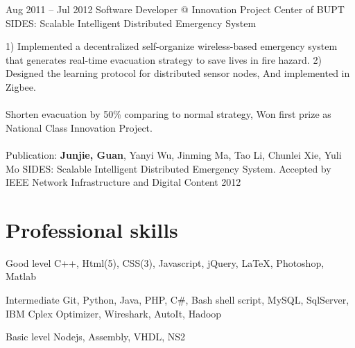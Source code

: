 \documentclass{tccv}
\begin{document}
\begin{eventlist}
    
    
    
    
    
    
    
    
    
    
    
    
    
   





\item{Aug 2011 -- Jul 2012}
     {Software Developer @ Innovation Project Center of BUPT}
     {SIDES: Scalable Intelligent Distributed Emergency System}
     
     1) Implemented a decentralized self-organize wireless-based emergency system that generates real-time evacuation strategy to save lives in fire hazard. 2) Designed the learning protocol for distributed sensor nodes, And implemented in Zigbee.
\\\\
Shorten evacuation by 50\% comparing to normal strategy, Won first prize as National Class Innovation Project.
\\\\
Publication: \textbf{Junjie, Guan}, Yanyi Wu, Jinming Ma, Tao Li, Chunlei Xie, Yuli Mo SIDES: Scalable Intelligent Distributed Emergency System. Accepted by IEEE Network Infrastructure and Digital Content 2012
     
\end{eventlist}









































\if
\section{Professional skills}

\begin{factlist}

\item{Good level}
     {C++, Html(5), CSS(3), Javascript, jQuery, \LaTeX, Photoshop, Matlab}

\item{Intermediate}
     {Git, Python, Java, PHP, C\#, Bash shell script, MySQL, SqlServer, IBM Cplex Optimizer, Wireshark, AutoIt, Hadoop}

\item{Basic level}
     {Nodejs, Assembly, VHDL, NS2}

\end{factlist}

\fi
\end{document}
